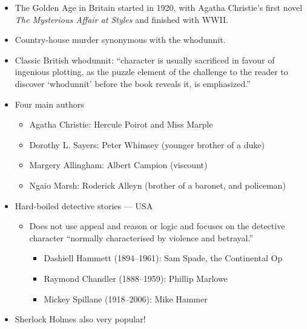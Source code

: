\documentclass[a4paper,landscape,headrule,footrule,xetex]{foils}
\begin{document}
\begin{itemize}

  \item The Golden Age in Britain started in 1920, with Agatha
    Christie’s first novel \textit{The Mysterious Affair at Styles}
    and finished with WWII.
    \item  Country-house murder synonymous with the whodunnit.
    \item    Classic British whodunnit: “character is usually
      sacrificed in favour of ingenious plotting, as the puzzle
      element of the challenge to the reader to discover ‘whodunnit’
      before the book reveals it, is emphasized.”  
    \item Four main authors
      \begin{itemize}
      \item Agatha Christie: Hercule Poirot and Miss Marple
      \item Dorothy L. Sayers: Peter Whimsey (younger brother of a duke)
      \item Margery Allingham: Albert Campion (viscount)
      \item Ngaio Marsh: Roderick Alleyn (brother of a baronet, and policeman)
      \end{itemize}
    \end{itemize}
    \newpage
{}
\begin{itemize}
 \item Hard-boiled detective stories — USA
      \begin{itemize}
      \item  Does not use appeal and reason or logic and focuses on the
        detective character “normally characterised by violence and
        betrayal.”
        \begin{itemize}
        \item Dashiell Hammett (1894–1961): Sam Spade, the Continental Op
        \item Raymond Chandler (1888–1959): Phillip Marlowe
        \item Mickey Spillane (1918–2006): Mike Hammer
        \end{itemize}
      \end{itemize}
    \item Sherlock Holmes also very popular!
    \end{itemize}
\end{document}
